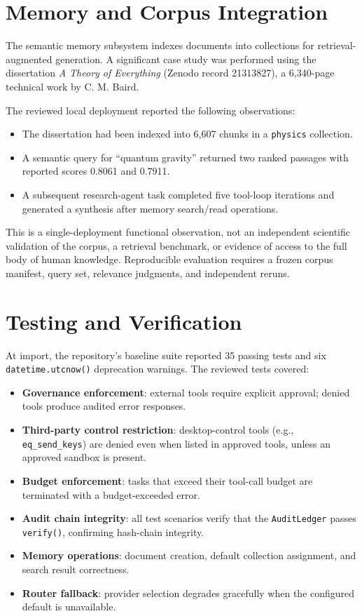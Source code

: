 \documentclass[11pt]{article}
\begin{document}
\section{Memory and Corpus Integration}

The semantic memory subsystem indexes documents into collections for retrieval-augmented generation. A significant case study was performed using the dissertation \emph{A Theory of Everything} (Zenodo record 21313827), a 6,340-page technical work by C. M. Baird.

The reviewed local deployment reported the following observations:
\begin{itemize}[leftmargin=*]
  \item The dissertation had been indexed into 6,607 chunks in a \texttt{physics} collection.
  \item A semantic query for ``quantum gravity'' returned two ranked passages with reported scores 0.8061 and 0.7911.
  \item A subsequent research-agent task completed five tool-loop iterations and generated a synthesis after memory search/read operations.
\end{itemize}

This is a single-deployment functional observation, not an independent scientific
validation of the corpus, a retrieval benchmark, or evidence of access to the full body
of human knowledge. Reproducible evaluation requires a frozen corpus manifest, query
set, relevance judgments, and independent reruns.

\section{Testing and Verification}

At import, the repository's baseline suite reported 35 passing tests and six
\texttt{datetime.utcnow()} deprecation warnings. The reviewed tests covered:

\begin{itemize}[leftmargin=*]
  \item \textbf{Governance enforcement}: external tools require explicit approval; denied tools produce audited error responses.
  \item \textbf{Third-party control restriction}: desktop-control tools (e.g., \texttt{eq\_send\_keys}) are denied even when listed in approved tools, unless an approved sandbox is present.
  \item \textbf{Budget enforcement}: tasks that exceed their tool-call budget are terminated with a budget-exceeded error.
  \item \textbf{Audit chain integrity}: all test scenarios verify that the \texttt{AuditLedger} passes \texttt{verify()}, confirming hash-chain integrity.
  \item \textbf{Memory operations}: document creation, default collection assignment, and search result correctness.
  \item \textbf{Router fallback}: provider selection degrades gracefully when the configured default is unavailable.
\end{itemize}
\end{document}
